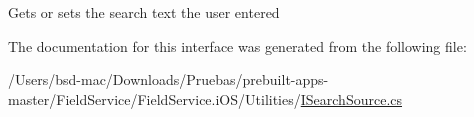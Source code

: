 Gets or sets the search text the user entered 



The documentation for this interface was generated from the following file\+:\begin{DoxyCompactItemize}
\item 
/\+Users/bsd-\/mac/\+Downloads/\+Pruebas/prebuilt-\/apps-\/master/\+Field\+Service/\+Field\+Service.\+i\+O\+S/\+Utilities/\hyperlink{_i_search_source_8cs}{I\+Search\+Source.\+cs}\end{DoxyCompactItemize}
